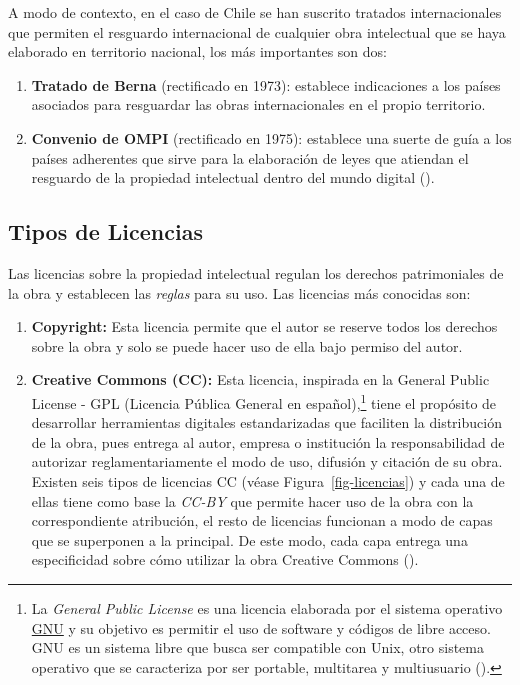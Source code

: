 \documentclass[
  spanish,
  a4paper,
  oneside]{scrbook}
\begin{document}
A modo de contexto, en el caso de Chile se han suscrito tratados
internacionales que permiten el resguardo internacional de cualquier
obra intelectual que se haya elaborado en territorio nacional, los más
importantes son dos:

\begin{enumerate}
\def\labelenumi{\arabic{enumi}.}
\item
  \textbf{Tratado de Berna} (rectificado en 1973): establece
  indicaciones a los países asociados para resguardar las obras
  internacionales en el propio territorio.
\item
  \textbf{Convenio de OMPI} (rectificado en 1975): establece una suerte
  de guía a los países adherentes que sirve para la elaboración de leyes
  que atiendan el resguardo de la propiedad intelectual dentro del mundo
  digital ().
\end{enumerate}

\subsection{Tipos de Licencias}\label{tipos-de-licencias}

Las licencias sobre la propiedad intelectual regulan los derechos
patrimoniales de la obra y establecen las \emph{reglas} para su uso. Las
licencias más conocidas son:

\begin{enumerate}
\def\labelenumi{\arabic{enumi}.}
\item
  \textbf{Copyright:} Esta licencia permite que el autor se reserve
  todos los derechos sobre la obra y solo se puede hacer uso de ella
  bajo permiso del autor.
\item
  \textbf{Creative Commons (CC):} Esta licencia, inspirada en la General
  Public License - GPL (Licencia Pública General en español),\footnote{La
    \emph{General Public License} es una licencia elaborada por el
    sistema operativo \href{https://www.gnu.org/licenses/}{GNU} y su
    objetivo es permitir el uso de software y códigos de libre acceso.
    GNU es un sistema libre que busca ser compatible con Unix, otro
    sistema operativo que se caracteriza por ser portable, multitarea y
    multiusuario ().}
  tiene el propósito de desarrollar herramientas digitales
  estandarizadas que faciliten la distribución de la obra, pues entrega
  al autor, empresa o institución la responsabilidad de autorizar
  reglamentariamente el modo de uso, difusión y citación de su obra.
  Existen seis tipos de licencias CC (véase Figura~\ref{fig-licencias})
  y cada una de ellas tiene como base la \emph{CC-BY} que permite hacer
  uso de la obra con la correspondiente atribución, el resto de
  licencias funcionan a modo de capas que se superponen a la principal.
  De este modo, cada capa entrega una especificidad sobre cómo utilizar
  la obra Creative Commons
  ().
\end{enumerate}
\end{document}
